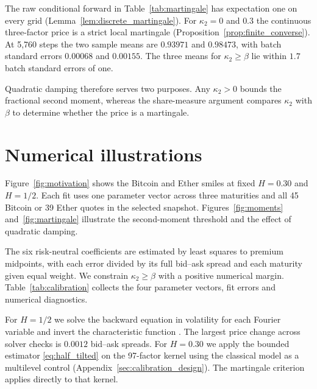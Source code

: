 \documentclass[11pt,a4paper]{article}
\theoremstyle{definition}
\begin{document}
The raw conditional forward in Table~\ref{tab:martingale} has expectation one on every grid (Lemma~\ref{lem:discrete_martingale}). For $\kappa_2=0$ and $0.3$ the continuous three-factor price is a strict local martingale (Proposition~\ref{prop:finite_converse}). At 5,760 steps the two sample means are $0.93971$ and $0.98473$, with batch standard errors $0.00068$ and $0.00155$. The three means for $\kappa_2\ge\beta$ lie within $1.7$ batch standard errors of one.

Quadratic damping therefore serves two purposes. Any $\kappa_2>0$ bounds the fractional second moment, whereas the share-measure argument compares $\kappa_2$ with $\beta$ to determine whether the price is a martingale.

\section{Numerical illustrations}\label{sec:illustrations}

Figure~\ref{fig:motivation} shows the Bitcoin and Ether smiles at fixed $H=0.30$ and $H=1/2$. Each fit uses one parameter vector across three maturities and all 45 Bitcoin or 39 Ether quotes in the selected snapshot. Figures~\ref{fig:moments} and~\ref{fig:martingale} illustrate the second-moment threshold and the effect of quadratic damping.

The six risk-neutral coefficients are estimated by least squares to premium midpoints, with each error divided by its full bid--ask spread and each maturity given equal weight. We constrain $\kappa_2\ge\beta$ with a positive numerical margin. Table~\ref{tab:calibration} collects the four parameter vectors, fit errors and numerical diagnostics.

For $H=1/2$ we solve the backward equation in volatility for each Fourier variable and invert the characteristic function \citep{SeppRakhmonov2023}. The largest price change across solver checks is $0.0012$ bid--ask spreads. For $H=0.30$ we apply the bounded estimator \eqref{eq:half_tilted} on the 97-factor kernel using the classical model as a multilevel control (Appendix~\ref{sec:calibration_design}). The martingale criterion applies directly to that kernel.
\end{document}
